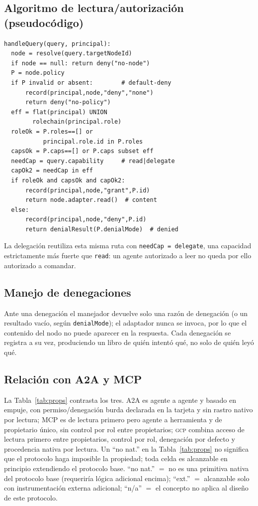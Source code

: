 \documentclass[conference,letterpaper]{IEEEtran}
\newcommand{\gcp}{\textsc{gcp}}
\begin{document}
\subsection{Algoritmo de lectura/autorizaci\'on (pseudoc\'odigo)}
{\footnotesize
\begin{verbatim}
handleQuery(query, principal):
  node = resolve(query.targetNodeId)
  if node == null: return deny("no-node")
  P = node.policy
  if P invalid or absent:        # default-deny
      record(principal,node,"deny","none")
      return deny("no-policy")
  eff = flat(principal) UNION
        rolechain(principal.role)
  roleOk = P.roles==[] or
           principal.role.id in P.roles
  capsOk = P.caps==[] or P.caps subset eff
  needCap = query.capability     # read|delegate
  capOk2 = needCap in eff
  if roleOk and capsOk and capOk2:
      record(principal,node,"grant",P.id)
      return node.adapter.read()  # content
  else:
      record(principal,node,"deny",P.id)
      return denialResult(P.denialMode)  # denied
\end{verbatim}}
La delegaci\'on reutiliza esta misma ruta con \texttt{needCap = delegate}, una capacidad estrictamente
m\'as fuerte que \texttt{read}: un agente autorizado a leer no queda por ello autorizado a comandar.

\subsection{Manejo de denegaciones}
Ante una denegaci\'on el manejador devuelve solo una raz\'on de denegaci\'on (o un resultado vac\'io,
seg\'un \texttt{denialMode}); el adaptador nunca se invoca, por lo que el contenido del nodo no puede
aparecer en la respuesta. Cada denegaci\'on se registra a su vez, produciendo un libro de qui\'en
intent\'o qu\'e, no solo de qui\'en ley\'o qu\'e.

\subsection{Relaci\'on con A2A y MCP}
La Tabla~\ref{tab:props} contrasta los tres. A2A es agente a agente y basado en empuje, con
permiso/denegaci\'on burda declarada en la tarjeta y sin rastro nativo por lectura; MCP es de lectura
primero pero agente a herramienta y de propietario \'unico, sin control por rol entre propietarios;
\gcp{} combina acceso de lectura primero entre propietarios, control por rol, denegaci\'on por
defecto y procedencia nativa por lectura. Un ``no nat.'' en la Tabla~\ref{tab:props} no significa que el
protocolo haga imposible la propiedad; toda celda es alcanzable en principio extendiendo el protocolo
base. ``no nat.'' $=$ no es una primitiva nativa del protocolo base (requerir\'ia l\'ogica adicional
encima); ``ext.'' $=$ alcanzable solo con instrumentaci\'on externa adicional; ``n/a'' $=$ el concepto
no aplica al dise\~no de este protocolo.
\end{document}
